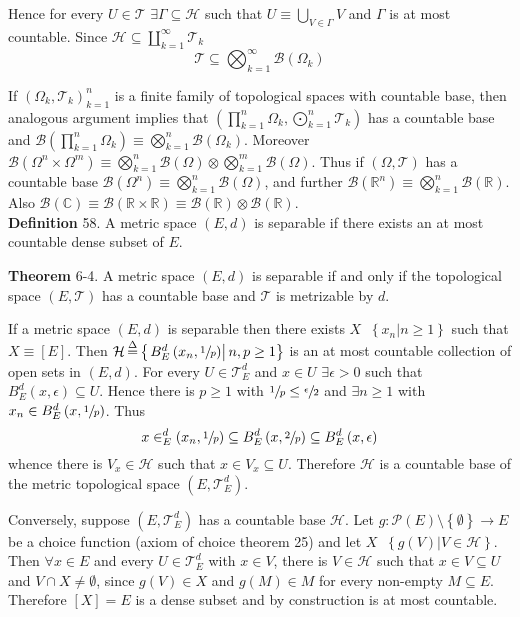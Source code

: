 \documentclass[a4paper]{article}
\newcommand{\obj}[1]{\left\{ #1 \right \}}
\newcommand{\clo}[1]{\left [ #1 \right ]}
\newcommand{\brac}[1]{\left ( #1 \right )}
\newcommand{\induc}[1]{\left . #1 \right \vert}
\newcommand{\Real}{\mathbb{R}}
\newcommand{\Cplx}{\mathbb{C}}
\newcommand{\Tcal}{\mathcal{T}}
\newcommand{\borel}[1]{\mathcal{B}\brac{#1}}
\newcommand{\pwr}[1]{\mathcal{P}\brac{#1}}
\newcommand{\defn}{\mathop{\overset{\Delta}{=}}\nolimits}
\begin{document}
Hence for every $U\in \Tcal$ $\exists \Gamma\subseteq \mathcal{H}$ such that $U\equiv \bigcup_{V\in \Gamma} V$ and $\Gamma$ is at most countable. Since $\mathcal{H}\subseteq \coprod_{k=1}^\infty \Tcal_k$ \[\Tcal \subseteq \bigotimes_{k=1}^\infty \borel{\Omega_k}\]

If $\brac{\Omega_k,\Tcal_k}_{k=1}^n$ is a finite family of topological spaces with countable base, then analogous argument implies that $\brac{\prod_{k=1}^n \Omega_k, \bigodot_{k=1}^n \Tcal_k}$ has a countable base and $\borel{\prod_{k=1}^n \Omega_k} \equiv \bigotimes_{k=1}^n \borel{\Omega_k}$. Moreover $\borel{ \Omega^n\times \Omega^m} \equiv \bigotimes_{k=1}^n \borel{\Omega} \otimes \bigotimes_{k=1}^m \borel{\Omega}$. Thus if $\brac{\Omega, \Tcal}$ has a countable base $\borel{\Omega^n} \equiv \bigotimes_{k=1}^n\borel{\Omega}$, and further $\borel{\Real^n} \equiv \bigotimes_{k=1}^n \borel{\Real}$. Also $\borel{\Cplx} \equiv \borel{\Real\times\Real} \equiv \borel{\Real}\otimes \borel{\Real}$.\\

\noindent \textbf{Definition} 58.
A metric space $\brac{E, d}$ is separable if there exists an at most countable dense subset of $E$.

\label{thm:metric_separab}\textbf{Theorem} 6-4.
A metric space $\brac{E, d}$ is separable if and only if the topological space $\brac{E, \Tcal}$ has a countable base and $\Tcal$ is metrizable by $d$.

If a metric space $\brac{E,d}$ is separable then there exists $X\defn \obj{ \induc{ x_n } n\geq 1 }$ such that $X \equiv \clo{E}$. Then $\mathcal{H} \defn \obj{ \induc{ B^d_E\brac{x_n, \sfrac{1}{p} } } n,p\geq 1 }$ is an at most countable collection of open sets in $\brac{E,d}$. For every $U\in \Tcal_E^d$ and $x\in U$ $\exists \epsilon>0$ such that $B_E^d\brac{x, \epsilon}\subseteq U$. Hence there is $p\geq 1$ with $\sfrac{1}{p} \leq \sfrac{ \epsilon }{2}$ and $\exists n\geq 1$ with $x_n\in B_E^d\brac{x, \sfrac{1}{p}}$. Thus \[x\in _E^d\brac{x_n, \sfrac{1}{p}}\subseteq B_E^d\brac{x, \sfrac{2}{p}} \subseteq B_E^d\brac{x, \epsilon}\] whence there is $V_x\in \mathcal{H}$ such that $x\in V_x\subseteq U$. Therefore $\mathcal{H}$ is a countable base of the metric topological space $\brac{E, \Tcal_E^d}$.

Conversely, suppose $\brac{E, \Tcal_E^d}$ has a countable base $\mathcal{H}$. Let $g:\pwr{E}\setminus \obj{\emptyset }\to E$ be a choice function (axiom of choice theorem 25) and let $X\defn \obj{ \induc{ g\brac{V} } V\in \mathcal{H} }$. Then $\forall x\in E$ and every $U\in \Tcal_E^d$ with $x\in V$, there is $V\in \mathcal{H}$ such that $x\in V\subseteq U$ and $V\cap X\neq \emptyset$, since $g\brac{V}\in X$ and $g\brac{M}\in M$ for every non-empty $M\subseteq E$. Therefore $\clo{X} = E$ is a dense subset and by construction is at most countable.
\end{document}

